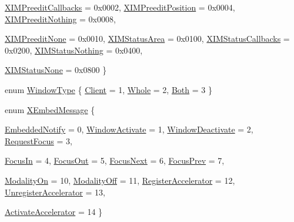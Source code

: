\begin{DoxyCompactItemize}
\hyperlink{namespace_tao_1_1_platform_1_1_x11_a90968e47c9d770cef201f56c70f857f8}{XIMPreeditCallbacks} =  0x0002, 
\hyperlink{namespace_tao_1_1_platform_1_1_x11_a90968e47c9d770cef201f56c70f857f8}{XIMPreeditPosition} =  0x0004, 
\hyperlink{namespace_tao_1_1_platform_1_1_x11_a90968e47c9d770cef201f56c70f857f8}{XIMPreeditNothing} =  0x0008, 
\par
\hyperlink{namespace_tao_1_1_platform_1_1_x11_a90968e47c9d770cef201f56c70f857f8}{XIMPreeditNone} =  0x0010, 
\hyperlink{namespace_tao_1_1_platform_1_1_x11_a90968e47c9d770cef201f56c70f857f8}{XIMStatusArea} =  0x0100, 
\hyperlink{namespace_tao_1_1_platform_1_1_x11_a90968e47c9d770cef201f56c70f857f8}{XIMStatusCallbacks} =  0x0200, 
\hyperlink{namespace_tao_1_1_platform_1_1_x11_a90968e47c9d770cef201f56c70f857f8}{XIMStatusNothing} =  0x0400, 
\par
\hyperlink{namespace_tao_1_1_platform_1_1_x11_a90968e47c9d770cef201f56c70f857f8}{XIMStatusNone} =  0x0800
 \}
\item 
enum \hyperlink{namespace_tao_1_1_platform_1_1_x11_aeaa75533f9c53c7a1904f065dbf0c6dc}{WindowType} \{ \hyperlink{namespace_tao_1_1_platform_1_1_x11_aeaa75533f9c53c7a1904f065dbf0c6dc}{Client} =  1, 
\hyperlink{namespace_tao_1_1_platform_1_1_x11_aeaa75533f9c53c7a1904f065dbf0c6dc}{Whole} =  2, 
\hyperlink{namespace_tao_1_1_platform_1_1_x11_aeaa75533f9c53c7a1904f065dbf0c6dc}{Both} =  3
 \}
\item 
enum \hyperlink{namespace_tao_1_1_platform_1_1_x11_aa84372894573549c711a2201e6644a8f}{XEmbedMessage} \{ \par
\hyperlink{namespace_tao_1_1_platform_1_1_x11_aa84372894573549c711a2201e6644a8f}{EmbeddedNotify} =  0, 
\hyperlink{namespace_tao_1_1_platform_1_1_x11_aa84372894573549c711a2201e6644a8f}{WindowActivate} =  1, 
\hyperlink{namespace_tao_1_1_platform_1_1_x11_aa84372894573549c711a2201e6644a8f}{WindowDeactivate} =  2, 
\hyperlink{namespace_tao_1_1_platform_1_1_x11_aa84372894573549c711a2201e6644a8f}{RequestFocus} =  3, 
\par
\hyperlink{namespace_tao_1_1_platform_1_1_x11_aa84372894573549c711a2201e6644a8f}{FocusIn} =  4, 
\hyperlink{namespace_tao_1_1_platform_1_1_x11_aa84372894573549c711a2201e6644a8f}{FocusOut} =  5, 
\hyperlink{namespace_tao_1_1_platform_1_1_x11_aa84372894573549c711a2201e6644a8f}{FocusNext} =  6, 
\hyperlink{namespace_tao_1_1_platform_1_1_x11_aa84372894573549c711a2201e6644a8f}{FocusPrev} =  7, 
\par
\hyperlink{namespace_tao_1_1_platform_1_1_x11_aa84372894573549c711a2201e6644a8f}{ModalityOn} =  10, 
\hyperlink{namespace_tao_1_1_platform_1_1_x11_aa84372894573549c711a2201e6644a8f}{ModalityOff} =  11, 
\hyperlink{namespace_tao_1_1_platform_1_1_x11_aa84372894573549c711a2201e6644a8f}{RegisterAccelerator} =  12, 
\hyperlink{namespace_tao_1_1_platform_1_1_x11_aa84372894573549c711a2201e6644a8f}{UnregisterAccelerator} =  13, 
\par
\hyperlink{namespace_tao_1_1_platform_1_1_x11_aa84372894573549c711a2201e6644a8f}{ActivateAccelerator} =  14
 \}
\end{DoxyCompactItemize}
